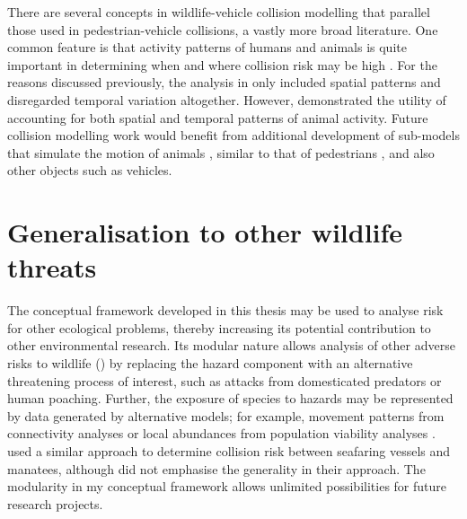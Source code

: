 There are several concepts in wildlife-vehicle collision modelling that parallel those used in pedestrian-vehicle collisions, a vastly more broad literature. One common feature is that activity patterns of humans and animals is quite important in determining when and where collision risk may be high \citep{mira11,lao11}. For the reasons discussed previously, the analysis in  only included spatial patterns and disregarded temporal variation altogether. However,  demonstrated the utility of accounting for both spatial and temporal patterns of animal activity. Future collision modelling work would benefit from additional development of sub-models that simulate the motion of animals \citep[see][]{jaar07}, similar to that of pedestrians \citep[see][]{lohn10}, and also other objects such as vehicles.

\section{Generalisation to other wildlife threats}

The conceptual framework developed in this thesis may be used to analyse risk for other ecological problems, thereby increasing its potential contribution to other environmental research. Its modular nature allows analysis of other adverse risks to wildlife () by replacing the hazard component with an alternative threatening process of interest, such as attacks from domesticated predators or human poaching. Further, the exposure of species to hazards may be represented by data generated by alternative models; for example, movement patterns from connectivity analyses \citep{mcra08} or local abundances from population viability analyses \citep{beis02}. \cite{baud13} used a similar approach to determine collision risk between seafaring vessels and manatees, although did not emphasise the generality in their approach. The modularity in my conceptual framework allows unlimited possibilities for future research projects.

